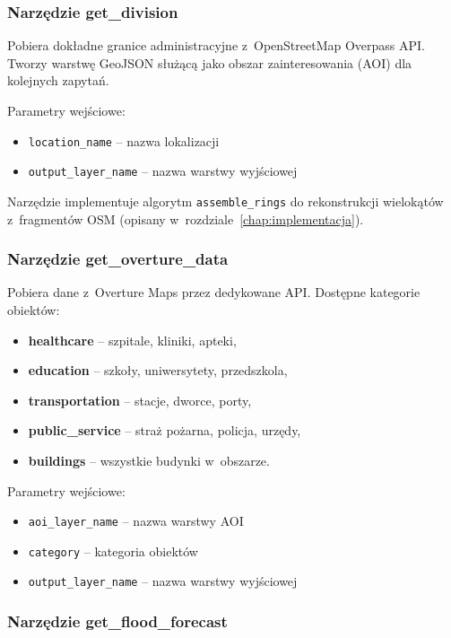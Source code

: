 \subsubsection{Narzędzie get\_division}

Pobiera dokładne granice administracyjne z~OpenStreetMap Overpass API. Tworzy warstwę GeoJSON służącą jako obszar zainteresowania (AOI) dla kolejnych zapytań.

Parametry wejściowe:
\begin{itemize}
    \item \texttt{location\_name} -- nazwa lokalizacji
    \item \texttt{output\_layer\_name} -- nazwa warstwy wyjściowej
\end{itemize}

Narzędzie implementuje algorytm \texttt{assemble\_rings} do rekonstrukcji wielokątów z~fragmentów OSM (opisany w~rozdziale~\ref{chap:implementacja}).

\subsubsection{Narzędzie get\_overture\_data}

Pobiera dane z~Overture Maps przez dedykowane API. Dostępne kategorie obiektów:
\begin{itemize}
    \item \textbf{healthcare} -- szpitale, kliniki, apteki,
    \item \textbf{education} -- szkoły, uniwersytety, przedszkola,
    \item \textbf{transportation} -- stacje, dworce, porty,
    \item \textbf{public\_service} -- straż pożarna, policja, urzędy,
    \item \textbf{buildings} -- wszystkie budynki w~obszarze.
\end{itemize}

Parametry wejściowe:
\begin{itemize}
    \item \texttt{aoi\_layer\_name} -- nazwa warstwy AOI
    \item \texttt{category} -- kategoria obiektów
    \item \texttt{output\_layer\_name} -- nazwa warstwy wyjściowej
\end{itemize}

\subsubsection{Narzędzie get\_flood\_forecast}

